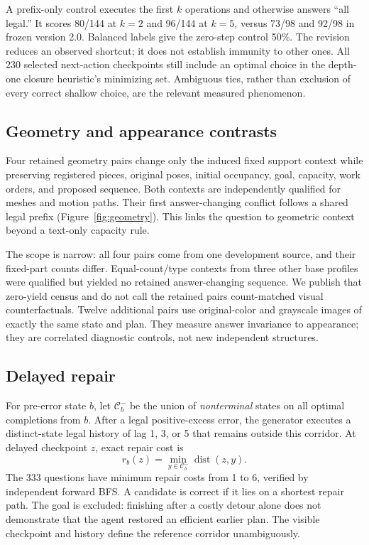 \documentclass[10pt,twocolumn,letterpaper]{article}
\begin{document}
A prefix-only control executes the first $k$ operations and otherwise
answers ``all legal.'' It scores 80/144 at $k=2$ and 96/144 at $k=5$,
versus 73/98 and 92/98 in frozen version 2.0. Balanced labels give the
zero-step control 50\%. The revision reduces an observed shortcut;
it does not establish immunity to other ones. All 230 selected next-action
checkpoints still include an optimal choice in the depth-one closure
heuristic's minimizing set. Ambiguous ties, rather than exclusion of every
correct shallow choice, are the relevant measured phenomenon.

\subsection{Geometry and appearance contrasts}
Four retained geometry pairs change only the induced fixed support
context while preserving registered pieces, original poses, initial
occupancy, goal, capacity, work orders, and proposed sequence.
Both contexts are independently qualified for meshes and motion paths.
Their first answer-changing conflict follows a shared legal prefix
(Figure~\ref{fig:geometry}). This links the question to geometric context
beyond a text-only capacity rule.

The scope is narrow: all four pairs come from one development source,
and their fixed-part counts differ. Equal-count/type contexts from three
other base profiles were qualified but yielded no retained answer-changing
sequence. We publish that zero-yield census and do not call the retained
pairs count-matched visual counterfactuals. Twelve additional pairs use
original-color and grayscale images of exactly the same state and plan.
They measure answer invariance to appearance; they are correlated
diagnostic controls, not new independent structures.

\subsection{Delayed repair}
For pre-error state $b$, let $\mathcal C_b^{-}$ be the union of
\emph{nonterminal} states on all optimal completions from $b$.
After a legal positive-excess error, the generator executes a distinct-state
legal history of lag 1, 3, or 5 that remains outside this corridor.
At delayed checkpoint $z$, exact repair cost is
\begin{equation}
 r_b(z)=\min_{y\in\mathcal C_b^{-}}\operatorname{dist}(z,y).
\end{equation}
The 333 questions have minimum repair costs from 1 to 6, verified by
independent forward BFS. A candidate is correct if it lies on a shortest
repair path. The goal is excluded: finishing after a costly detour alone
does not demonstrate that the agent restored an efficient earlier plan.
The visible checkpoint and history define the reference corridor
unambiguously.
\end{document}
